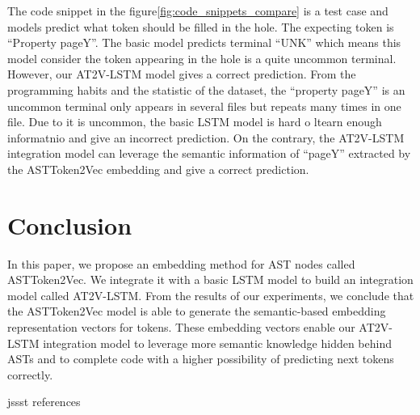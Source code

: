 \documentclass[T, E]{compsoft}
\begin{document}
The code snippet in the figure\ref{fig:code_snippets_compare} is a test case and models predict what token should be filled in the hole.
The expecting token is ``Property pageY''.
The basic model predicts terminal ``UNK'' which means this model consider the token appearing in the hole is a quite uncommon terminal.
However, our AT2V-LSTM model gives a correct prediction.
From the programming habits and the statistic of the dataset, the ``property pageY'' is an uncommon terminal only appears in several files but repeats many times in one file. 
Due to it is uncommon, the basic LSTM model is hard o ltearn enough informatnio and give an incorrect prediction.
On the contrary, the AT2V-LSTM integration model can leverage the semantic information of ``pageY'' extracted by the ASTToken2Vec embedding and give a correct prediction.



\section{Conclusion}
In this paper, we propose an embedding method for AST nodes called ASTToken2Vec. 
We integrate it with a basic LSTM model to build an integration model called AT2V-LSTM.
From the results of our experiments, we conclude that the ASTToken2Vec model is able to generate the semantic-based embedding representation vectors for tokens.
These embedding vectors enable our AT2V-LSTM integration model to leverage more semantic knowledge hidden behind ASTs and to complete code with a higher possibility of predicting next tokens correctly. 



 {jssst}
 {references}
\end{document}
